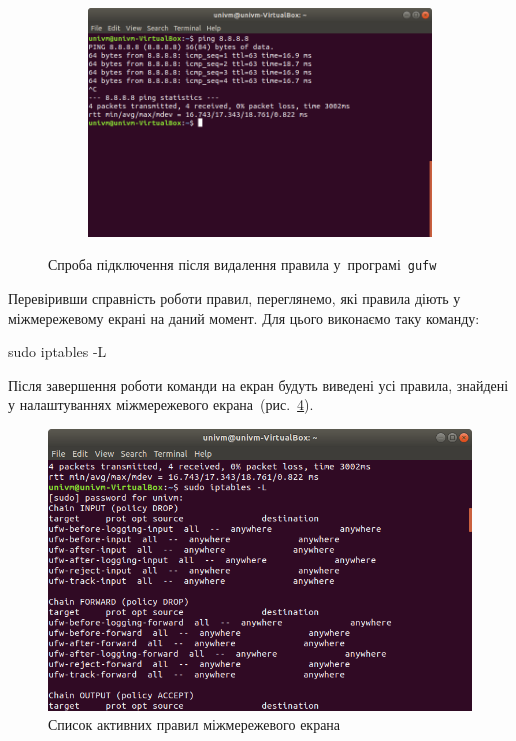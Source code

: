 \documentclass[
	a4paper,
	oneside,
	BCOR = 10mm,
	DIV = 12,
	12pt,
	headings = normal,
]{scrartcl}
\newlength{\gridunitwidth}
\newcommand{\progname}[1]{\texttt{#1}}
\begin{document}
\begin{figure}[!htbp]
\begin{subfigure}[b]{4 \gridunitwidth - 1em / 2}
				\caption{}
				\label{subfig:03-01}
			\end{subfigure}%
			\hspace{1em}%
			\begin{subfigure}[b]{8 \gridunitwidth - 1em / 2}
				\includegraphics[width = \columnwidth]{./assets/12.png}
				\caption{}
				\label{subfig:03-02}
			\end{subfigure}%
			\caption{Спроба підключення після видалення правила у~програмі~\progname{\textenglish{gufw}}}
			\label{fig:03}
		\end{figure}

		Перевіривши справність роботи правил, переглянемо, які правила діють у міжмережевому екрані на даний момент. Для цього виконаємо таку команду:
		\begin{codegeneric}
			sudo iptables -L
		\end{codegeneric}
		Після завершення роботи команди на екран будуть виведені усі правила, знайдені у налаштуваннях міжмережевого екрана~(рис.~\ref{fig:04}).

		\begin{figure}[!htbp]
			\centering
			\includegraphics[width = 6 \gridunitwidth]{./assets/13.png}
			\caption{Список активних правил міжмережевого екрана}
			\label{fig:04}
		\end{figure}
\end{document}
